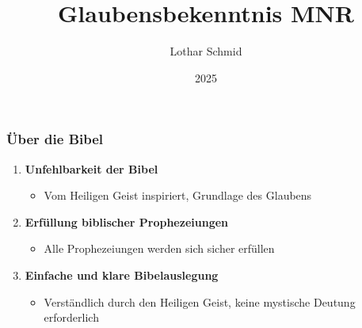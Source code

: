 \documentclass[aspectratio=43]{beamer}
\title{Glaubensbekenntnis MNR}
\author{Lothar Schmid}
\date{2025}
\begin{document}
\begin{frame}
    \maketitle    
\end{frame}

\begin{frame}
    \frametitle{Über die Bibel}  %
    \parbox{\textwidth}{%
            \begin{enumerate}
                \item \textbf{Unfehlbarkeit der Bibel}
                    \begin{itemize}              
                        \item Vom Heiligen Geist inspiriert, Grundlage des Glaubens
                    \end{itemize}
                    \vspace{0.25cm}                    
                \item \textbf{Erfüllung biblischer Prophezeiungen}
                    \begin{itemize}
                        \item Alle Prophezeiungen werden sich sicher erfüllen
                    \end{itemize}
                    \vspace{0.25cm}
                \item \textbf{Einfache und klare Bibelauslegung}
                    \begin{itemize}
                        \item Verständlich durch den Heiligen Geist, keine mystische Deutung erforderlich
                    \end{itemize}              
            \end{enumerate} 
            }
\end{frame}
\end{document}
